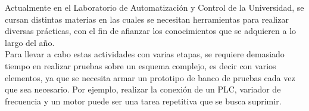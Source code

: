 Actualmente en el Laboratorio de Automatización y Control de la Universidad, se cursan distintas materias en las cuales se necesitan herramientas para realizar diversas prácticas, con el fin de afianzar los conocimientos que se adquieren a lo largo del año.
\\

Para llevar a cabo estas actividades con varias etapas, se requiere demasiado tiempo en realizar pruebas sobre un esquema complejo, es decir con varios elementos, ya que se necesita armar un prototipo de banco de pruebas cada vez que sea necesario. Por ejemplo, realizar la conexión de un PLC, variador de frecuencia y un motor puede ser una tarea repetitiva que se busca suprimir. 

\newpage